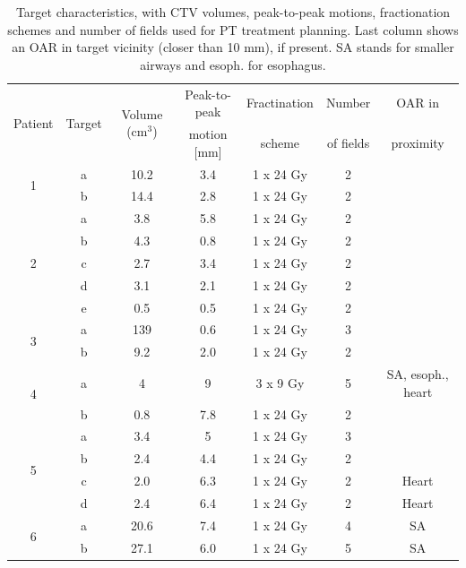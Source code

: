 \documentclass[type=dr, dr=rernat, accentcolor=tud7b,colorbacktitle, bigchapter, openright, twoside, 12pt ]{tudthesis}
\begin{document}
\begin{table}[H]
	\centering
	\caption{Target characteristics, with CTV volumes, peak-to-peak motions, fractionation schemes and number of fields used for PT treatment planning. Last column 
	shows an OAR in target vicinity (closer than 10 mm), if present. SA stands for smaller airways and esoph. for esophagus.}
	\begin{tabular}{c|c|c|c|c|c|c}
		\hline\hline
		\multirow{2}{*}{Patient} & \multirow{2}{*}{Target} & \multirow{2}{*}{Volume (cm$^3$)} & Peak-to-peak & Fractination & Number & OAR in \\
		 & & & motion [mm] & scheme & of fields & proximity \\
		\hline
		\multirow{2}{*}{1} & a & 10.2 & 3.4  & 1 x 24 Gy & 2 & \\
		 & b & 14.4 & 2.8 & 1 x 24 Gy  & 2 &  \\

		 
		 \hline
		 \multirow{5}{*}{2} & a & 3.8 & 5.8  & 1 x 24 Gy & 2 &\\
		  & b & 4.3 & 0.8  & 1 x 24 Gy& 2 &\\
		  & c & 2.7 & 3.4  & 1 x 24 Gy & 2&\\
		  & d & 3.1 & 2.1  & 1 x 24 Gy & 2&\\
		  & e & 0.5 & 0.5  & 1 x 24 Gy & 2&\\
		  \hline
		  \multirow{2}{*}{3} & a & 139 & 0.6 & 1 x 24 Gy & 3 \\
		 & b & 9.2 & 2.0  & 1 x 24 Gy & 2 \\
		 \hline
		 \multirow{2}{*}{4} & a & 4 & 9  & 3 x 9 Gy  & 5 & SA, esoph., heart \\
		 & b & 0.8 & 7.8  & 1 x 24 Gy & 2 \\
		 \hline
		 \multirow{4}{*}{5} & a & 3.4   & 5  & 1 x 24 Gy & 3 &  \\
				    & b & 2.4 & 4.4  & 1 x 24 Gy & 2 &\\
				    & c & 2.0 & 6.3  & 1 x 24 Gy& 2& Heart\\
				    & d & 2.4 & 6.4  & 1 x 24 Gy & 2 & Heart\\
		\hline	    
		\multirow{2}{*}{6} & a & 20.6 & 7.4 & 1 x 24 Gy & 4 & SA  \\
		 & b & 27.1 & 6.0  & 1 x 24 Gy &5 & SA  \\
		 

\end{tabular}
\end{table}
\end{document}
